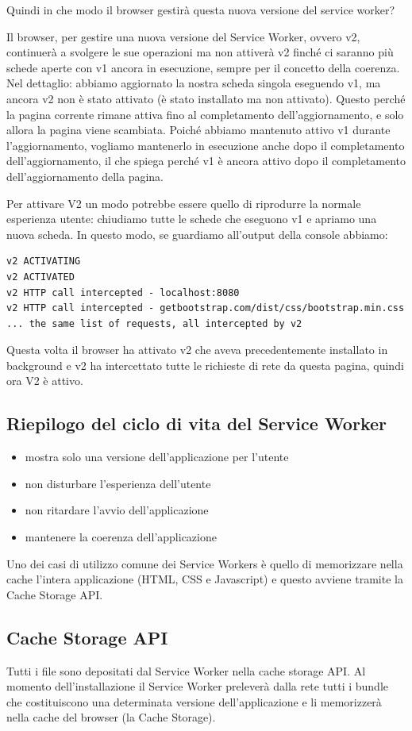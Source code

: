 \documentclass[italian]{article}
\begin{document}
Quindi in che modo il browser gestirà questa nuova versione del service worker?

Il browser, per gestire una nuova versione del Service Worker, ovvero v2, continuerà a svolgere le sue operazioni ma non attiverà v2 finché ci saranno più schede aperte con v1 ancora in esecuzione, sempre per il concetto della coerenza. Nel dettaglio: abbiamo aggiornato la nostra scheda singola eseguendo v1, ma ancora v2 non è stato attivato (è stato installato ma non attivato). Questo perché la pagina corrente rimane attiva fino al completamento dell'aggiornamento, e solo allora la pagina viene scambiata. Poiché abbiamo mantenuto attivo v1 durante l'aggiornamento, vogliamo mantenerlo in esecuzione anche dopo il completamento dell'aggiornamento, il che spiega perché v1 è ancora attivo dopo il completamento dell'aggiornamento della pagina.

Per attivare  V2 un modo potrebbe essere quello di riprodurre la normale esperienza utente: chiudiamo tutte le schede che eseguono v1 e apriamo una nuova scheda. In questo modo, se guardiamo all'output della console abbiamo:
\begin{lstlisting}
v2 ACTIVATING
v2 ACTIVATED
v2 HTTP call intercepted - localhost:8080
v2 HTTP call intercepted - getbootstrap.com/dist/css/bootstrap.min.css
... the same list of requests, all intercepted by v2
\end{lstlisting}
Questa volta il browser ha attivato v2 che aveva precedentemente installato in background e v2 ha intercettato tutte le richieste di rete da questa pagina, quindi ora V2 è attivo.
\subsection{Riepilogo del ciclo di vita del Service Worker}
\begin{itemize}
\item mostra solo una versione dell'applicazione per l'utente
\item non disturbare l'esperienza dell'utente
\item non ritardare l'avvio dell'applicazione
\item mantenere la coerenza dell'applicazione
\end{itemize}

Uno dei casi di utilizzo comune dei Service Workers è quello di memorizzare nella cache l'intera applicazione (HTML, CSS e Javascript) e questo avviene tramite la Cache Storage API.

\subsection{Cache Storage API}
Tutti i file sono depositati dal Service Worker nella cache storage API. Al momento dell'installazione il Service Worker preleverà dalla rete tutti i bundle che costituiscono una determinata versione dell'applicazione e li memorizzerà nella cache del browser (la Cache Storage).
\end{document}
